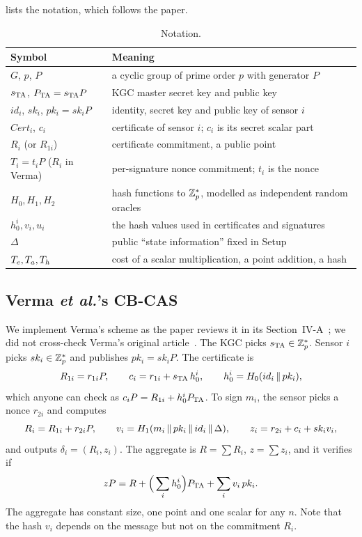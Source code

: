  lists the notation, which follows the paper.

\begin{table}[ht]
\centering\small
\caption{Notation.}\label{tab:notation}
\begin{tabularx}{\linewidth}{lX}
\toprule
Symbol & Meaning \\
\midrule
$G$, $p$, $P$ & a cyclic group of prime order $p$ with generator $P$ \\
$s_{\mathrm{TA}}$, $P_{\mathrm{TA}}=s_{\mathrm{TA}} P$ & KGC master secret key and public key \\
$id_i$, $sk_i$, $pk_i=sk_iP$ & identity, secret key and public key of sensor $i$ \\
$\mathit{Cert}_i$, $c_i$ & certificate of sensor $i$; $c_i$ is its secret scalar part \\
$R_i$ (or $R_{1i}$) & certificate commitment, a public point \\
$T_i=t_iP$ ($R_i$ in Verma) & per-signature nonce commitment; $t_i$ is the nonce \\
$H_0,H_1,H_2$ & hash functions to $\mathbb{Z}_p^{*}$, modelled as independent random oracles \\
$h_0^i, v_i, u_i$ & the hash values used in certificates and signatures \\
$\Delta$ & public ``state information'' fixed in \textsf{Setup} \\
$T_{e},T_{a},T_{h}$ & cost of a scalar multiplication, a point addition, a hash \\
\bottomrule
\end{tabularx}
\end{table}

\subsection{Verma \emph{et al.}'s CB-CAS}
We implement Verma's scheme as the paper reviews it in its Section~IV-A~\cite{qiao2023}; we did not
cross-check Verma's original article~\cite{verma2020}. The KGC picks $s_{\mathrm{TA}}\in\mathbb{Z}_p^{*}$. Sensor $i$ picks
$sk_i\in\mathbb{Z}_p^{*}$ and publishes $pk_i=sk_iP$. The certificate is
\begin{equation}
R_{1i}=r_{1i}P,\qquad c_i=r_{1i}+s_{\mathrm{TA}}\,h_0^i,\qquad h_0^i=H_0(id_i\,\|\, pk_i),
\end{equation}
which anyone can check as $c_iP=R_{1i}+h_0^iP_{\mathrm{TA}}$. To sign $m_i$, the sensor picks a nonce $r_{2i}$ and
computes
\begin{equation}\label{eq:verma-sign}
R_i=R_{1i}+r_{2i}P,\qquad v_i=H_1(m_i\,\|\, pk_i\,\|\, id_i\,\|\,\Delta),\qquad
z_i=r_{2i}+c_i+sk_i v_i,
\end{equation}
and outputs $\delta_i=(R_i,z_i)$. The aggregate is $R=\sum R_i$, $z=\sum z_i$, and it verifies if
\begin{equation}\label{eq:verma-verify}
zP=R+\Big(\sum_i h_0^i\Big)P_{\mathrm{TA}}+\sum_i v_i\,pk_i .
\end{equation}
The aggregate has constant size, one point and one scalar for any $n$. Note that the hash $v_i$ depends
on the message but not on the commitment $R_i$.

